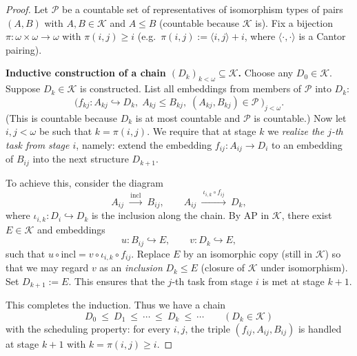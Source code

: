 \begin{mynote}

    \begin{proof}

        Let $\mathcal{P}$ be a countable set of representatives of isomorphism types of pairs
        $(A,B)$ with $A,B\in\mathcal{K}$ and $A\le B$ (countable because $\mathcal{K}$ is).
        Fix a bijection $\pi:\omega\times\omega\to\omega$ with $\pi(i,j)\ge i$
        (e.g.\ $\pi(i,j):=\langle i,j\rangle+i$, where $\langle\cdot,\cdot\rangle$ is a Cantor pairing).

        \textbf{Inductive construction of a chain $(D_k)_{k<\omega}\subseteq\mathcal{K}$.}
        Choose any $D_0\in\mathcal{K}$. Suppose $D_k\in\mathcal{K}$ is constructed.
        List all embeddings from members of $\mathcal{P}$ into $D_k$:
        \[
            \bigl( f_{k j}:A_{k j}\hookrightarrow D_k,\; A_{k j}\le B_{k j},\; (A_{k j},B_{k j})\in\mathcal{P}\ \bigr)_{j<\omega}.
        \]
        (This is countable because $D_k$ is at most countable and $\mathcal{P}$ is countable.)
        Now let $i,j<\omega$ be such that $k=\pi(i,j)$.
        We require that at stage $k$ we \emph{realize the $j$-th task from stage $i$}, namely:
        extend the embedding $f_{i j}:A_{i j}\to D_i$ to an embedding of $B_{i j}$ into the next
        structure $D_{k+1}$.

        To achieve this, consider the diagram
        \[
            A_{i j}\ \xrightarrow{\ \mathrm{incl}\ }\ B_{i j},\qquad
            A_{i j}\ \xrightarrow{\ \iota_{i,k}\circ f_{i j}\ }\ D_k,
        \]
        where $\iota_{i,k}:D_i\hookrightarrow D_k$ is the inclusion along the chain.
        By AP in $\mathcal{K}$, there exist $E\in\mathcal{K}$ and embeddings
        \[
            u: B_{i j}\hookrightarrow E,\qquad v: D_k\hookrightarrow E,
        \]
        such that $u\circ \mathrm{incl} = v\circ \iota_{i,k}\circ f_{i j}$.
        Replace $E$ by an isomorphic copy (still in $\mathcal{K}$) so that we may regard $v$
        as an \emph{inclusion} $D_k\le E$ (closure of $\mathcal{K}$ under isomorphism).
        Set $D_{k+1}:=E$. This ensures that the $j$-th task from stage $i$ is met at stage $k+1$.

        This completes the induction. Thus we have a chain
        \[
            D_0\ \le\ D_1\ \le\ \cdots\ \le\ D_k\ \le\ \cdots\qquad (D_k\in\mathcal{K})
        \]
        with the scheduling property: for every $i,j$, the triple $(f_{i j},A_{i j},B_{i j})$
        is handled at stage $k+1$ with $k=\pi(i,j)\ge i$.


\end{proof}
\end{mynote}
